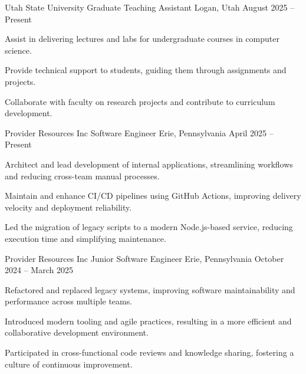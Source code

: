 \documentclass[10pt, a4paper]{russell}
\begin{document}
\begin{cventries}

    \cventry
        {Utah State University}
        {Graduate Teaching Assistant}
        {Logan, Utah}
        {August 2025 – Present}
        {
            \begin{cvitems}
                \item Assist in delivering lectures and labs for undergraduate courses in computer science.
                \item Provide technical support to students, guiding them through assignments and projects.
                \item Collaborate with faculty on research projects and contribute to curriculum development.
            \end{cvitems}
        }


    \cventry
        {Provider Resources Inc}
        {Software Engineer}
        {Erie, Pennsylvania}
        {April 2025 – Present}
        {
            \begin{cvitems}
                \item Architect and lead development of internal applications, streamlining workflows and reducing cross-team manual processes.
                \item Maintain and enhance CI/CD pipelines using GitHub Actions, improving delivery velocity and deployment reliability.
                \item Led the migration of legacy scripts to a modern Node.js-based service, reducing execution time and simplifying maintenance.
            \end{cvitems}
        }

    \cventry
        {Provider Resources Inc}
        {Junior Software Engineer}
        {Erie, Pennsylvania}
        {October 2024 – March 2025}
        {
            \begin{cvitems}
                \item Refactored and replaced legacy systems, improving software maintainability and performance across multiple teams.
                \item Introduced modern tooling and agile practices, resulting in a more efficient and collaborative development environment.
                \item Participated in cross-functional code reviews and knowledge sharing, fostering a culture of continuous improvement.
            \end{cvitems}
        }

\end{cventries}
\end{document}
